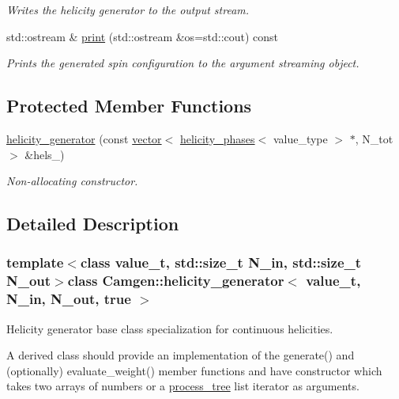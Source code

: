 \begin{DoxyCompactItemize}
\begin{DoxyCompactList}\small\item\em Writes the helicity generator to the output stream. \end{DoxyCompactList}\item 
std\-::ostream \& \hyperlink{a00268_a5939b444b5d8ffdca9c3ec5ccf059dc9}{print} (std\-::ostream \&os=std\-::cout) const 
\begin{DoxyCompactList}\small\item\em Prints the generated spin configuration to the argument streaming object. \end{DoxyCompactList}\end{DoxyCompactItemize}
\subsection*{Protected Member Functions}
\begin{DoxyCompactItemize}
\item 
\hyperlink{a00268_ab88ea2c915c7352fe7cb80178d8ef4a6}{helicity\-\_\-generator} (const \hyperlink{a00559}{vector}$<$ \hyperlink{a00271}{helicity\-\_\-phases}$<$ value\-\_\-type $>$ $\ast$, N\-\_\-tot $>$ \&hels\-\_\-)
\begin{DoxyCompactList}\small\item\em Non-\/allocating constructor. \end{DoxyCompactList}\end{DoxyCompactItemize}


\subsection{Detailed Description}
\subsubsection*{template$<$class value\-\_\-t, std\-::size\-\_\-t N\-\_\-in, std\-::size\-\_\-t N\-\_\-out$>$class Camgen\-::helicity\-\_\-generator$<$ value\-\_\-t, N\-\_\-in, N\-\_\-out, true $>$}

Helicity generator base class specialization for continuous helicities. 

A derived class should provide an implementation of the generate() and (optionally) evaluate\-\_\-weight() member functions and have constructor which takes two arrays of numbers or a \hyperlink{a00431}{process\-\_\-tree} list iterator as arguments. 

